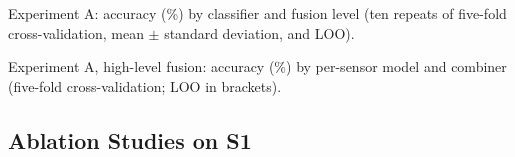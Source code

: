 \begin{table}[!htbp]
\centering
\caption[Experiment A: accuracy by classifier and fusion level]{Experiment A: accuracy (\%) by classifier and fusion level (ten repeats of five-fold cross-validation, mean $\pm$ standard deviation, and LOO).}
\label{tab:expA}
\footnotesize

\end{table}

\begin{table}[!htbp]
\centering
\caption[Experiment A: high-level fusion by per-sensor model and combiner]{Experiment A, high-level fusion: accuracy (\%) by per-sensor model and combiner (five-fold cross-validation; LOO in brackets).}
\label{tab:expAhigh}
\footnotesize
\begin{adjustbox}{max width=\textwidth}

\end{adjustbox}
\end{table}

\subsection{Ablation Studies on S1}
\label{sec:ablations}

